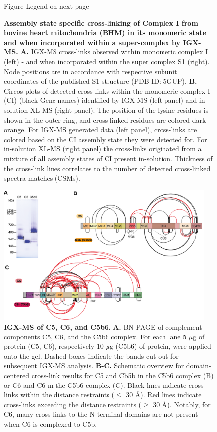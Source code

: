 \begin{subappendices}
\begin{figure}[hb]
        \caption{Figure Legend on next page}
        \label{fig:ch2_app_fig5}
    \end{figure}
    \addtocounter{figure}{-1}
    \begin{figure}[ht]
        \caption{\textbf{Assembly state specific cross-linking of Complex I from bovine heart mitochondria (BHM) in its monomeric state and when incorporated within a super-complex by IGX-MS.} \textbf{A.} IGX-MS cross-links observed within monomeric complex I (left) - and when incorporated within the super complex S1 (right). Node positions are in accordance with respective subunit coordinates of the published S1 structure (PDB ID: 5GUP). \textbf{B.} Circos plots of detected cross-links within the monomeric complex I (CI) (black Gene names) identified by IGX-MS (left panel) and in-solution XL-MS (right panel). The position of the lysine residues is shown in the outer-ring, and cross-linked residues are colored dark orange. For IGX-MS generated data (left panel), cross-links are colored based on the CI assembly state they were detected for. For in-solution XL-MS (right panel) the cross-links originated from a mixture of all assembly states of CI present in-solution. Thickness of the cross-link lines correlates to the number of detected cross-linked spectra matches (CSMs).}
    \end{figure}
    \begin{figure}[hbt]
        \center
        \includegraphics[width=0.95\textwidth]{Chapter.2/Figures/SI_Figure5.png}
        \caption{\textbf{IGX-MS of C5, C6, and C5b6.} \textbf{A.} BN-PAGE of complement components C5, C6, and the C5b6 complex. For each lane 5 $\mu$g of protein (C5, C6), respectively 10 $\mu$g (C5b6) of protein, were applied onto the gel. Dashed boxes indicate the bands cut out for subsequent IGX-MS analysis. \textbf{B-C.} Schematic overview for domain-centered cross-link results for C5 and Cb5b in the C5b6 complex (B) or C6 and C6 in the C5b6 complex (C). Black lines indicate cross-links within the distance restraints ($\leq$ 30 Å). Red lines indicate cross-links exceeding the distance restraints ($\geq$ 30 Å). Notably, for C6, many cross-links to the N-terminal domains are not present when C6 is complexed to C5b.}

\end{figure}
\end{subappendices}
